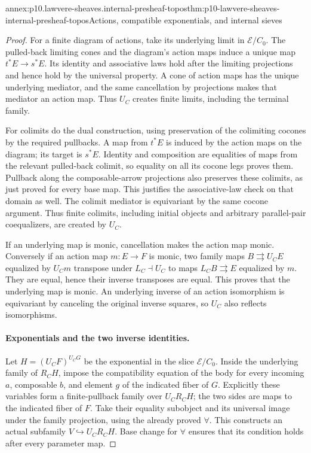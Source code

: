 \begin{annexitem}{annex:p10.lawvere-sheaves.internal-presheaf-topos}{thm:p10-lawvere-sheaves-internal-presheaf-topos}{Actions, compatible exponentials, and internal sieves}
\begin{proof}
For a finite diagram of actions, take its underlying limit
in \(\mathcal E/C_0\).  The pulled-back limiting cones
and the diagram's action maps induce a unique map
\(t^*E\to s^*E\).  Its identity and associative laws
hold after the limiting projections and hence hold by the
universal property.  A cone of action maps has the unique
underlying mediator, and the same cancellation by projections
makes that mediator an action map.  Thus \(U_C\) creates
finite limits, including the terminal family.

For colimits do the dual construction, using preservation
of the colimiting cocones by the required pullbacks.  A map
from \(t^*E\) is induced by the action maps on the diagram;
its target is \(s^*E\).  Identity and composition are
equalities of maps from the relevant pulled-back colimit,
so equality on all its cocone legs proves them.  Pullback
along the composable-arrow projections also preserves these
colimits, as just proved for every base map.  This justifies
the associative-law check on that domain as well.  The
colimit mediator is equivariant by the same cocone argument.
Thus finite colimits, including initial objects and arbitrary
parallel-pair coequalizers, are created by \(U_C\).

If an underlying map is monic, cancellation makes the action
map monic.  Conversely if an action map \(m:E\to F\)
is monic, two family maps \(B\rightrightarrows U_CE\)
equalized by \(U_Cm\) transpose under \(L_C\dashv U_C\)
to maps \(L_CB\rightrightarrows E\) equalized by \(m\).
They are equal, hence their inverse transposes are equal.
This proves that the underlying map is monic.  An underlying
inverse of an action isomorphism is equivariant by canceling
the original inverse squares, so \(U_C\) also reflects
isomorphisms.

\paragraph{Exponentials and the two inverse identities.}
Let \(H=(U_CF)^{U_CG}\) be the exponential in the slice
\(\mathcal E/C_0\).  Inside the underlying family of
\(R_CH\), impose the compatibility equation of the body
for every incoming \(a\), composable \(b\), and element
\(g\) of the indicated fiber of \(G\).  Explicitly these
variables form a finite-pullback family over \(U_CR_CH\);
the two sides are maps to the indicated fiber of \(F\).
Take their equality subobject and its universal image under
the family projection, using the already proved \(\forall\).
This constructs an actual subfamily \(V\hookrightarrow U_CR_CH\).
Base change for \(\forall\) ensures that its condition
holds after every parameter map.


\end{proof}
\end{annexitem}

